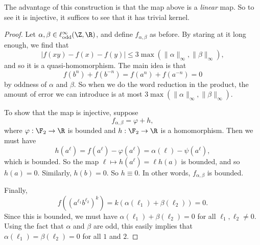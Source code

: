 \documentclass[a4paper]{article}
\begin{document}
The advantage of this construction is that the map above is a \emph{linear} map. So to see it is injective, it suffices to see that it has trivial kernel.
\begin{proof}
  Let $\alpha, \beta \in \ell_{\mathrm{odd}}^\infty (\Z, \R)$, and define $f_{\alpha, \beta}$ as before. By staring at it long enough, we find that
  \[
    |f(xy) - f(x) - f(y)| \leq 3 \max (\|\alpha\|_\infty, \|\beta\|_\infty),
  \]
  and so it is a quasi-homomorphism. The main idea is that
  \[
    f(b^n) + f(b^{-n}) = f(a^n) + f(a^{-n}) = 0
  \]
  by oddness of $\alpha$ and $\beta$. So when we do the word reduction in the product, the amount of error we can introduce is at most $3 \max (\|\alpha\|_\infty, \|\beta\|_\infty)$.

  To show that the map is injective, suppose
  \[
    f_{\alpha, \beta} = \varphi + h,
  \]
  where $\varphi: \F_2 \to \R$ is bounded and $h: \F_2 \to \R$ is a homomorphism. Then we must have
  \[
    h(a^\ell) = f(a^\ell) - \varphi(a^\ell) = \alpha(\ell) - \psi(a^\ell),
  \]
  which is bounded. So the map $\ell \mapsto h(a^\ell) = \ell h(a)$ is bounded, and so $h(a) = 0$. Similarly, $h(b) = 0$. So $h \equiv 0$. In other words, $f_{\alpha, \beta}$ is bounded.

  Finally,
  \[
    f((a^{\ell_1} b^{\ell_2})^k) = k (\alpha(\ell_1) + \beta(\ell_2)) = 0.
  \]
  Since this is bounded, we must have $\alpha(\ell_1) + \beta(\ell_2) = 0$ for all $\ell_1, \ell_2 \not= 0$. Using the fact that $\alpha$ and $\beta$ are odd, this easily implies that $\alpha(\ell_1) = \beta(\ell_2) = 0$ for all $1$ and $2$.

%
\end{proof}
\end{document}
